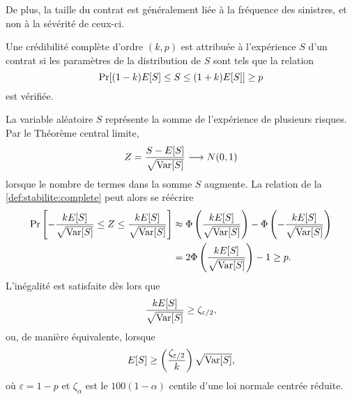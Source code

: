 De plus, la taille du contrat est généralement liée à la fréquence des
sinistres, et non à la sévérité de ceux-ci.

\begin{definition}
  \label{def:stabilite:complete}
  Une crédibilité complète d'ordre $(k, p)$ est attribuée à
  l'expérience $S$ d'un contrat si les paramètres de la distribution
  de $S$ sont tels que la relation
  \begin{displaymath}
    \Pr[(1 - k) E [ S ] \leq S \leq (1 + k) E [ S ]] \geq p
  \end{displaymath}
  est vérifiée.
\end{definition}

La variable aléatoire $S$ représente la somme de l'expérience de
plusieurs risques. Par le Théorème central limite,
\begin{equation*}
  Z = \frac{S - E [ S ]}{\sqrt{\operatorname{Var} [ S ]}}
  \longrightarrow
  N(0, 1)
\end{equation*}
lorsque le nombre de termes dans la somme $S$ augmente. La relation de
la \autoref{def:stabilite:complete} peut alors se réécrire
\begin{align*}
  \Pr
  \left[
    - \frac{k E [ S ]}{\sqrt{\operatorname{Var} [ S ]}}
    \leq Z \leq
    \frac{k E [ S ]}{\sqrt{\operatorname{Var} [ S ]}}
  \right]
  &\approx
    \Phi
    \left(
      \frac{k E [ S ]}{\sqrt{\operatorname{Var} [ S ]}}
    \right) -
    \Phi
    \left(
      - \frac{k E [ S ]}{\sqrt{\operatorname{Var} [ S ]}}
    \right) \\
  &=
    2 \Phi
    \left(
    \frac{k E [ S ]}{\sqrt{\operatorname{Var} [ S ]}}
    \right) - 1 \geq p.
\end{align*}
L'inégalité est satisfaite dès lors que
\begin{equation*}
  \frac{k E [ S ]}{\sqrt{\operatorname{Var} [ S ]}} \geq \zeta_{\varepsilon/2},
\end{equation*}
ou, de manière équivalente, lorsque
\begin{equation}
  \label{eq:stabilite:complete}
  E [ S ] \geq
  \left(
    \frac{\zeta_{\varepsilon/2}}{k}
  \right)
  \sqrt{\operatorname{Var} [ S ]},
\end{equation}
où $\varepsilon = 1 - p$ et $\zeta_\alpha$ est le $100(1 -
\alpha)${\ieme} centile d'une loi normale centrée réduite.

